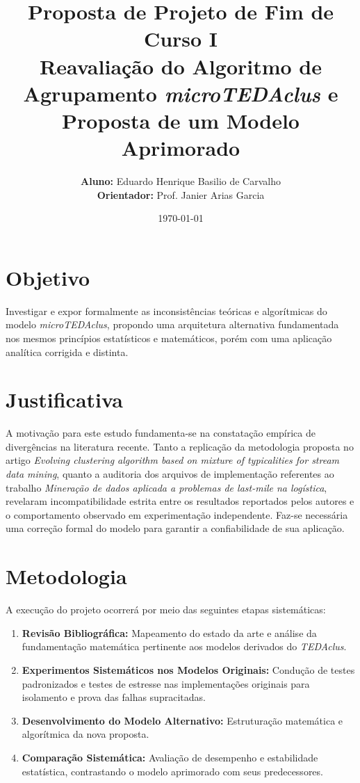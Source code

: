 \documentclass[12pt, a4paper]{article}
\title{\vspace{-2cm}\textbf{Proposta de Projeto de Fim de Curso I}\\ \large Reavaliação do Algoritmo de Agrupamento \textit{microTEDAclus} e Proposta de um Modelo Aprimorado}
\author{\textbf{Aluno:} Eduardo Henrique Basilio de Carvalho \\ \textbf{Orientador:} Prof. Janier Arias Garcia}
\date{\today}
\begin{document}
\maketitle
\onehalfspacing

\section{Objetivo}
Investigar e expor formalmente as inconsistências teóricas e algorítmicas do modelo \textit{microTEDAclus}, propondo uma arquitetura alternativa fundamentada nos mesmos princípios estatísticos e matemáticos, porém com uma aplicação analítica corrigida e distinta.

\section{Justificativa}
A motivação para este estudo fundamenta-se na constatação empírica de divergências na literatura recente. Tanto a replicação da metodologia proposta no artigo \textit{Evolving clustering algorithm based on mixture of typicalities for stream data mining}, quanto a auditoria dos arquivos de implementação referentes ao trabalho \textit{Mineração de dados aplicada a problemas de last-mile na logística}, revelaram incompatibilidade estrita entre os resultados reportados pelos autores e o comportamento observado em experimentação independente. Faz-se necessária uma correção formal do modelo para garantir a confiabilidade de sua aplicação.

\section{Metodologia}
A execução do projeto ocorrerá por meio das seguintes etapas sistemáticas:
\begin{enumerate}
    \item \textbf{Revisão Bibliográfica:} Mapeamento do estado da arte e análise da fundamentação matemática pertinente aos modelos derivados do \textit{TEDAclus}.
    \item \textbf{Experimentos Sistemáticos nos Modelos Originais:} Condução de testes padronizados e testes de estresse nas implementações originais para isolamento e prova das falhas supracitadas.
    \item \textbf{Desenvolvimento do Modelo Alternativo:} Estruturação matemática e algorítmica da nova proposta.
    \item \textbf{Comparação Sistemática:} Avaliação de desempenho e estabilidade estatística, contrastando o modelo aprimorado com seus predecessores.
\end{enumerate}
\end{document}
